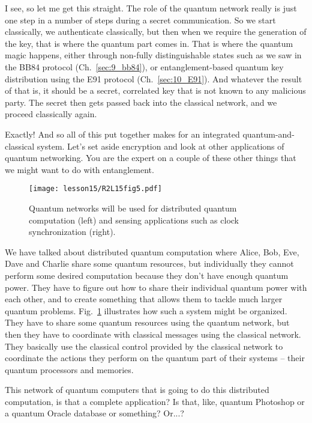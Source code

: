 \mmm I see, so let me get this straight. The role of the quantum network really is just one step in a number of steps during a secret communication. So we start classically, we authenticate classically, but then when we require the generation of the key, that is where the quantum part comes in. That is where the quantum magic happens, either through non-fully distinguishable states such as we saw in the BB84 protocol (Ch.~\ref{sec:9_bb84}), or entanglement-based quantum key distribution using the E91 protocol (Ch.~\ref{sec:10_E91}). And whatever the result of that is, it should be a secret, correlated key that is not known to any malicious party. The secret then gets passed back into the classical network, and we proceed classically again.

\rrr Exactly!
And so all of this put together makes for an integrated quantum-and-classical system.
Let's set aside encryption and look at other applications of quantum networking. You are the expert on a couple of these other things that we might want to do with entanglement.

\begin{figure}[t]
    \centering
    \texttt{[image: lesson15/R2L15fig5.pdf]}
    \caption[Uses of quantum networking.]{Quantum networks will be used for distributed quantum computation (left) and sensing applications such as clock synchronization (right).}
    \label{fig:15-5-apps}
\end{figure}

\mmm We have talked about distributed quantum computation where Alice, Bob, Eve, Dave and Charlie share some quantum resources, but individually they cannot perform some desired computation because they don't have enough quantum power. They have to figure out how to share their individual quantum power with each other, and to create something that allows them to tackle much larger quantum problems. Fig.~\ref{fig:15-5-apps} illustrates how such a system might be organized. They have to share some quantum resources using the quantum network, but then they have to coordinate with classical messages using the classical network. They basically use the classical control provided by the classical network to coordinate the actions they perform on the quantum part of their systems -- their quantum processors and memories.

\rrr This network of quantum computers that is going to do this distributed computation, is that a complete application? Is that, like, quantum Photoshop or a quantum Oracle database or something? Or...?

